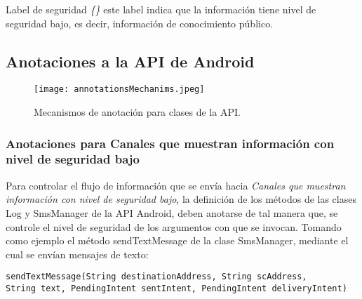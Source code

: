 Label de seguridad \emph{\{\}}\newline
este label indica que la información tiene nivel de seguridad bajo, es decir,
información de conocimiento público.

\subsection{Anotaciones a la API de Android}
\label{subsec:api}

\begin{figure}[h!]
	\begin{center}
	\texttt{[image: annotationsMechanims.jpeg]}
	\end{center}
	\caption{Mecanismos de anotación para clases de la API.}
	\label{fig:annotationsMechanims}  
\end{figure}

\subsubsection{Anotaciones para  Canales que muestran información con nivel de
seguridad bajo} 
Para controlar el flujo de información que se envía hacia
\textit{Canales que muestran información con nivel de seguridad bajo}, la
definición de los métodos de las clases Log y SmsManager de la API Android,
deben anotarse de tal manera que, se controle el nivel de seguridad de los
argumentos con que se invocan.\newline 
Tomando como ejemplo el método sendTextMessage de la clase SmsManager, mediante
el cual se envían mensajes de texto:
\begin{lstlisting}
sendTextMessage(String destinationAddress, String scAddress, 
String text, PendingIntent sentIntent, PendingIntent deliveryIntent)
\end{lstlisting}

